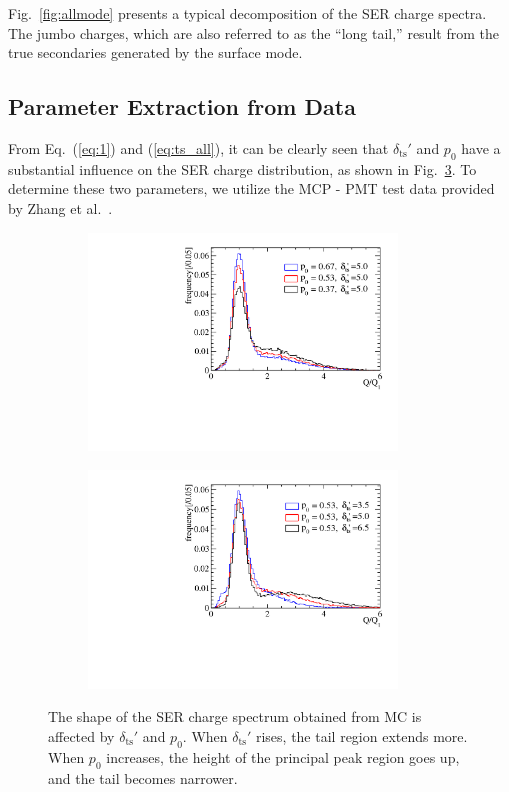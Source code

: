 Fig.~\ref{fig:allmode} presents a typical decomposition of the SER charge spectra. The jumbo charges, which are also referred to as the “long tail,” result from the true secondaries generated by the surface mode.

\subsection{Parameter Extraction from Data}\label{subsec:chitest}
From Eq.~(\ref{eq:1}) and (\ref{eq:ts_all}), it can be clearly seen that $\delta_{\mathrm{ts}}'$ and \(p_0\) have a substantial influence on the SER charge distribution, as shown in Fig.~\ref{fig:tsp}. To determine these two parameters, we utilize the MCP - PMT test data provided by Zhang et al.~\cite{Zhang:2023ued}.
\begin{figure}[h]
	\centering
	\begin{subfigure}{0.5\textwidth}
		\centering
		\includegraphics[width=0.9\textwidth]{PMTRelated/GTmodel/p.pdf}
		\caption{}
		\label{fig:p}
	\end{subfigure}%
	\hfill
	\begin{subfigure}{0.5\textwidth}
		\centering
		\includegraphics[width=0.9\textwidth]{PMTRelated/GTmodel/ts.pdf}
		\caption{}
		\label{fig:ts}
	\end{subfigure}
	\caption{The shape of the SER charge spectrum obtained from MC is affected by $\delta_{\mathrm{ts}}'$ and $p_0$. When $\delta_{\mathrm{ts}}'$ rises, the tail region extends more. When $p_0$ increases, the height of the principal peak region goes up, and the tail becomes  narrower.
	}
	\label{fig:tsp}
\end{figure}

